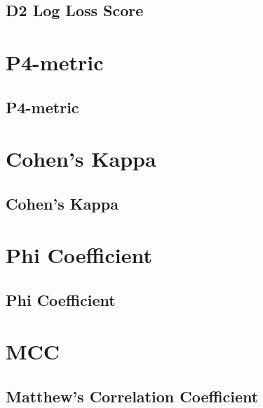 \subsection{D2 Log Loss Score}

\clearpage
\thispagestyle{customstyle}
\section{P4-metric}
\subsection{P4-metric}

\clearpage
\thispagestyle{customstyle}
\section{Cohen's Kappa}
\subsection{Cohen's Kappa}

\clearpage
\thispagestyle{customstyle}
\section{Phi Coefficient}
\subsection{Phi Coefficient}

\clearpage
\thispagestyle{customstyle}
\section{MCC}
\subsection{Matthew's Correlation Coefficient}